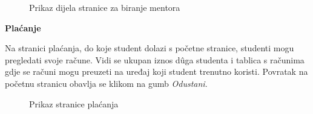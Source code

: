 \documentclass[times, utf8, zavrsni, numeric]{fer}
\begin{document}
        
        \begin{figure} [H]
          \centering
          \caption{Prikaz dijela stranice za biranje mentora}
        \end{figure}
        
        \noindent\textbf{Plaćanje}
        
        Na stranici plaćanja, do koje student dolazi s početne stranice, studenti mogu pregledati svoje račune. Vidi se ukupan iznos dûga studenta i tablica s računima gdje se računi mogu preuzeti na uređaj koji student trenutno koristi. Povratak na početnu stranicu obavlja se klikom na gumb \textit{Odustani}.
        
        \begin{figure} [H]
          \centering
          \caption{Prikaz stranice plaćanja}
        \end{figure}
        
\end{document}
